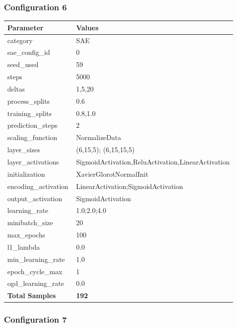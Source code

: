 \documentclass[a4paper,11pt,oneside]{article}
\theoremstyle{plain}
\theoremstyle{definition}
\begin{document}
	\newpage
	\subsubsection{Configuration 6}\label{config6}
	\begin{longtable}[H]{|p{0.3\linewidth}|p{0.7\linewidth}|} \hline \textbf{Parameter} &\textbf{Values} \\\hline{category} & {SAE} \\\hline
		{sae\_config\_id} & {0} \\\hline
		{seed\_used} & {59} \\\hline
		{steps} & {5000} \\\hline
		{deltas} & {1,5,20} \\\hline
		{process\_splits} & {0.6} \\\hline
		{training\_splits} & {0.8,1.0} \\\hline
		{prediction\_steps} & {2} \\\hline
		{scaling\_function} & {NormalizeData} \\\hline
		{layer\_sizes} & {(6,15,5); (6,15,15,5)} \\\hline
		{layer\_activations} & {SigmoidActivation,ReluActivation,LinearActivation} \\\hline
		{initialization} & {XavierGlorotNormalInit} \\\hline
		{encoding\_activation} & {LinearActivation;SigmoidActivation} \\\hline
		{output\_activation} & {SigmoidActivation} \\\hline
		{learning\_rate} & {1.0;2.0;4.0} \\\hline
		{minibatch\_size} & {20} \\\hline
		{max\_epochs} & {100} \\\hline
		{l1\_lambda} & {0.0} \\\hline
		{min\_learning\_rate} & {1.0} \\\hline
		{epoch\_cycle\_max} & {1} \\\hline
		{ogd\_learning\_rate} & {0.0} \\\hline
		{\textbf{Total Samples}} & {\textbf{192}} \\\hline
	\end{longtable}
	
	\newpage
	\subsubsection{Configuration 7}\label{config7}
\end{document}
